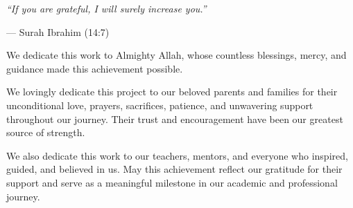 
\begin{center}
  \itshape
  ``If you are grateful, I will surely increase you.''\par
  \vspace{7pt}
  --- Surah Ibrahim (14:7)
\end{center}

\begingroup
  \setlength{\parskip}{0pt}%
  \vspace{-10pt}%
\endgroup

\vspace{-6pt}

We dedicate this work to Almighty Allah, whose countless blessings, mercy, and
guidance made this achievement possible.

\vspace{10pt}

We lovingly dedicate this project to our beloved parents and families for their
unconditional love, prayers, sacrifices, patience, and unwavering support
throughout our journey. Their trust and encouragement have been our greatest
source of strength.

\vspace{10pt}

We also dedicate this work to our teachers, mentors, and everyone who inspired,
guided, and believed in us. May this achievement reflect our gratitude for their
support and serve as a meaningful milestone in our academic and professional
journey.

\clearpage
